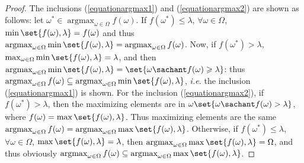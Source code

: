 \begin{proof}
The inclusions (\ref{equationargmax1}) and (\ref{equationargmax2})
are shown as follows: let $\omega^* \in \operatorname*{argmax}_{\omega \in \Omega} f(\omega)$.
If $f(\omega^*) \leqslant \lambda$, $\forall \omega \in \Omega$, 
$\min \set{ f(\omega), \lambda } = f(\omega)$ and thus
$\operatorname*{argmax}_{\omega \in \Omega} \min \set{ f(\omega), \lambda } = \operatorname*{argmax}_{\omega \in \Omega} f(\omega)$.
Now, if $f(\omega^*) > \lambda$, $\max_{\omega \in \Omega} \min \set{ f(\omega), \lambda } = \lambda$, 
and then $\operatorname*{argmax}_{\omega \in \Omega} \min \set{ f(\omega), \lambda } = \set{ \omega \sachant f(\omega) \geqslant \lambda }$:
thus $\operatorname*{argmax}_{\omega \in \Omega} f(\omega) \subseteq \operatorname*{argmax}_{\omega \in \Omega} \min \set{ f(\omega), \lambda }$,
\textit{i.e.} the inclusion (\ref{equationargmax1}) is shown.
For the inclusion (\ref{equationargmax2}), 
if $f(\omega^*)> \lambda$, then the maximizing elements are in $\omega \set{ \omega \sachant f(\omega) > \lambda }$,
where $f(\omega) = \max \set{ f(\omega), \lambda }$.
Thus maximizing elements are the same $\operatorname*{argmax}_{\omega \in \Omega} f(\omega) = \operatorname*{argmax}_{\omega \in \Omega} \max \set{ f(\omega), \lambda }$.
Otherwise, if $f(\omega^*) \leqslant \lambda$, $\forall \omega \in \Omega$,
$\max \set{ f(\omega), \lambda } = \lambda$, then $\operatorname*{argmax}_{\omega \in \Omega} \max \set{ f(\omega), \lambda } = \Omega$,
and thus obviously 
$\operatorname*{argmax}_{\omega \in \Omega} f(\omega) \subseteq \operatorname*{argmax}_{\omega \in \Omega} \max \set{ f(\omega), \lambda }$.


\end{proof}
